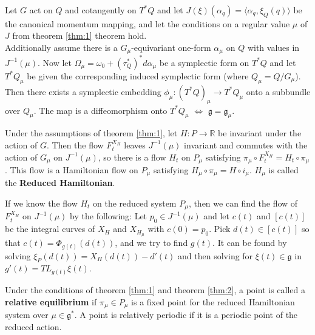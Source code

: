 \begin{thm}\label{thm:4}

\indent Let $G$ act on $Q$ and cotangently on $T^*Q$ and let $J(\xi)(\alpha_q) = \langle \alpha_q, \xi_Q(q) \rangle$ be the canonical momentum mapping, and let the conditions on a regular value $\mu$ of $J$ from theorem \ref{thm:1} theorem hold. \\
\indent Additionally assume there is a $G_{\mu}$-equivariant one-form $\alpha_{\mu}$ on $Q$ with values in $J^{-1}(\mu)$. Now let $\Omega_{\mu} = \omega_0 + (\tau^*_Q)^* d \alpha_{\mu}$ be a symplectic form on $T^*Q$ and let $T^*Q_{\mu}$ be given the corresponding induced symplectic form (where $Q_{\mu} = Q/G_{\mu}$). 
\indent Then there exists a symplectic embedding $\phi_{\mu}: (T^*Q)_{\mu} \to T^* Q_{\mu} $ onto a subbundle over $Q_{\mu}$. The map is a diffeomorphism onto $T^*Q_{\mu}$ $\iff$ $\mathfrak{g}=\mathfrak{g}_{\mu}$.

\end{thm}

\begin{thm} \label{thm:2}

Under the assumptions of theorem \ref{thm:1}, let $H: P \to \mathbb{R}$ be invariant under the action of $G$. Then the flow $F^{X_H}_t$ leaves $J^{-1}(\mu)$ invariant and commutes with the action of $G_{\mu}$ on $J^{-1}(\mu)$, so there is a flow $H_t$ on $P_{\mu}$ satisfying $\pi_{\mu} \circ F^{X_H}_t = H_t \circ \pi_{\mu}$. This flow is a Hamiltonian flow on $P_{\mu}$ satisfying $H_{\mu} \circ \pi_{\mu} = H \circ i_{\mu}$. $H_{\mu}$ is called the \textbf{Reduced Hamiltonian}.

\end{thm}

If we know the flow $H_t$ on the reduced system $P_{\mu}$, then we can find the flow of $F^{X_H}_t$ on $J^{-1}(\mu)$ by the following: Let $p_0 \in J^{-1}(\mu)$ and let $c(t)$ and $[c(t)]$ be the integral curves of $X_H$ and $X_{H_{\mu}}$ with $c(0)=p_0$. Pick $d(t) \in [c(t)]$ so that $c(t) = \Phi_{g(t)} (d(t))$, and we try to find $g(t)$. It can be found by solving $\xi_P(d(t)) = X_H(d(t)) - d'(t)$ and then solving for $\xi(t) \in \mathfrak{g}$ in $g'(t) = TL_{g(t)} \xi(t)$.

\begin{defn}

Under the conditions of theorem \ref{thm:1} and theorem \ref{thm:2}, a point is called a \textbf{relative equilibrium} if $\pi_{\mu} \in P_{\mu}$ is a fixed point for the reduced Hamiltonian system over $\mu \in \mathfrak{g}^*$. A point is relatively periodic if it is a periodic point of the reduced action.
\end{defn}

